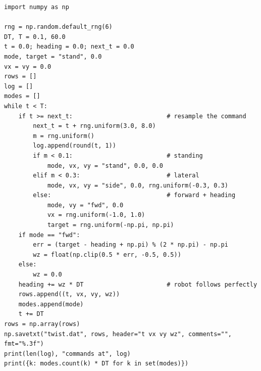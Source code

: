 \begin{verbatim}
import numpy as np

rng = np.random.default_rng(6)
DT, T = 0.1, 60.0
t = 0.0; heading = 0.0; next_t = 0.0
mode, target = "stand", 0.0
vx = vy = 0.0
rows = []
log = []
modes = []
while t < T:
    if t >= next_t:                          # resample the command
        next_t = t + rng.uniform(3.0, 8.0)
        m = rng.uniform()
        log.append(round(t, 1))
        if m < 0.1:                          # standing
            mode, vx, vy = "stand", 0.0, 0.0
        elif m < 0.3:                        # lateral
            mode, vx, vy = "side", 0.0, rng.uniform(-0.3, 0.3)
        else:                                # forward + heading
            mode, vy = "fwd", 0.0
            vx = rng.uniform(-1.0, 1.0)
            target = rng.uniform(-np.pi, np.pi)
    if mode == "fwd":
        err = (target - heading + np.pi) % (2 * np.pi) - np.pi
        wz = float(np.clip(0.5 * err, -0.5, 0.5))
    else:
        wz = 0.0
    heading += wz * DT                       # robot follows perfectly
    rows.append((t, vx, vy, wz))
    modes.append(mode)
    t += DT
rows = np.array(rows)
np.savetxt("twist.dat", rows, header="t vx vy wz", comments="", fmt="%.3f")
print(len(log), "commands at", log)
print({k: modes.count(k) * DT for k in set(modes)})
\end{verbatim}

\begin{center}
\end{center}

